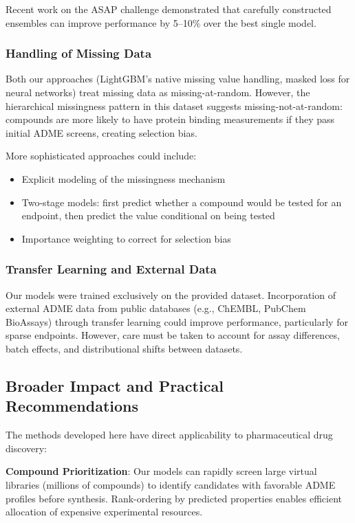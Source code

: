 \documentclass[11pt,a4paper]{article}
\begin{document}
Recent work on the ASAP challenge demonstrated that carefully constructed ensembles can improve performance by 5--10\% over the best single model.

\subsubsection{Handling of Missing Data}

Both our approaches (LightGBM's native missing value handling, masked loss for neural networks) treat missing data as missing-at-random. However, the hierarchical missingness pattern in this dataset suggests missing-not-at-random: compounds are more likely to have protein binding measurements if they pass initial ADME screens, creating selection bias.

More sophisticated approaches could include:
\begin{itemize}
    \item Explicit modeling of the missingness mechanism
    \item Two-stage models: first predict whether a compound would be tested for an endpoint, then predict the value conditional on being tested
    \item Importance weighting to correct for selection bias
\end{itemize}

\subsubsection{Transfer Learning and External Data}

Our models were trained exclusively on the provided dataset. Incorporation of external ADME data from public databases (e.g., ChEMBL, PubChem BioAssays) through transfer learning could improve performance, particularly for sparse endpoints. However, care must be taken to account for assay differences, batch effects, and distributional shifts between datasets.

\subsection{Broader Impact and Practical Recommendations}

The methods developed here have direct applicability to pharmaceutical drug discovery:

\textbf{Compound Prioritization}: Our models can rapidly screen large virtual libraries (millions of compounds) to identify candidates with favorable ADME profiles before synthesis. Rank-ordering by predicted properties enables efficient allocation of expensive experimental resources.
\end{document}

